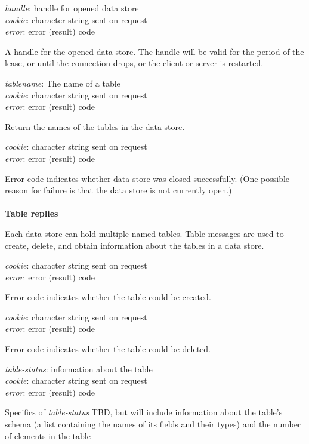{
\metP
    {\em handle}: handle for opened data store\\
    {\em cookie}: character string sent on request\\
    {\em error}: error (result) code

\metD 

    A handle for the opened data store. The handle will be valid for
    the period of the lease, or until the connection drops, or the
    client or server is restarted.  
}

{
\metP
    {\em tablename}: The name of a table\\
    {\em cookie}: character string sent on request\\
    {\em error}: error (result) code

\metD
    Return the names of the tables in the data store. 
}

{
\metP
    {\em cookie}: character string sent on request\\
    {\em error}: error (result) code

\metD
    Error code indicates whether data store was closed successfully.
    (One possible reason for failure is that the data store is not
    currently open.)
}

\paragraph{}
{\bf Table replies}

Each data store can hold multiple named tables. Table messages are used to
create, delete, and obtain information about the tables in a data store.

{
\metP
    {\em cookie}: character string sent on request\\
    {\em error}: error (result) code

\metD
    Error code indicates whether the table could be created. 
}

{
\metP
    {\em cookie}: character string sent on request\\
    {\em error}: error (result) code

\metD
    Error code indicates whether the table could be deleted. 
}

{
\metP
    {\em table-status}: information about the table\\
    {\em cookie}: character string sent on request\\
    {\em error}: error (result) code

\metD
    Specifics of {\em table-status} TBD, but will include information
    about the table's schema (a list containing the names of its
    fields and their types) and the number of elements in the table }

